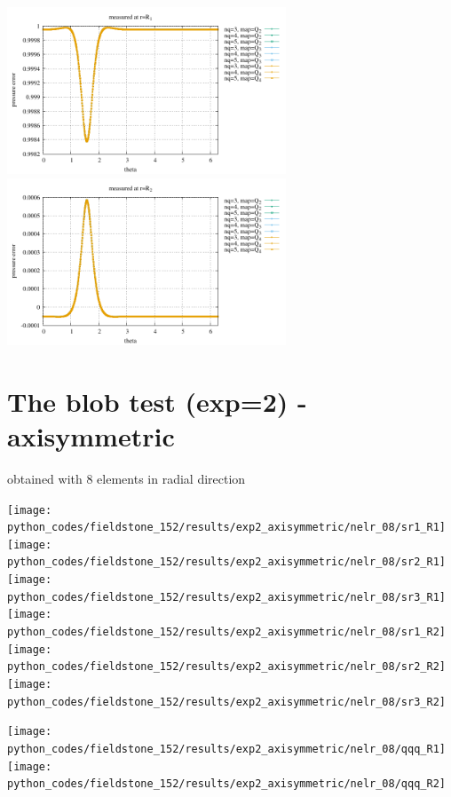 \begin{center}
\includegraphics[width=8.3cm]{python_codes/fieldstone_152/results/exp2/qqq_R1}
\includegraphics[width=8.3cm]{python_codes/fieldstone_152/results/exp2/qqq_R2}
\end{center}

\newpage
\section*{The blob test (exp=2) - axisymmetric}

obtained with 8 elements in radial direction

\begin{center}
\texttt{[image: python\_codes/fieldstone\_152/results/exp2\_axisymmetric/nelr\_08/sr1\_R1]}
\texttt{[image: python\_codes/fieldstone\_152/results/exp2\_axisymmetric/nelr\_08/sr2\_R1]}
\texttt{[image: python\_codes/fieldstone\_152/results/exp2\_axisymmetric/nelr\_08/sr3\_R1]}\\
\texttt{[image: python\_codes/fieldstone\_152/results/exp2\_axisymmetric/nelr\_08/sr1\_R2]}
\texttt{[image: python\_codes/fieldstone\_152/results/exp2\_axisymmetric/nelr\_08/sr2\_R2]}
\texttt{[image: python\_codes/fieldstone\_152/results/exp2\_axisymmetric/nelr\_08/sr3\_R2]}\\
\end{center}

\begin{center}
\texttt{[image: python\_codes/fieldstone\_152/results/exp2\_axisymmetric/nelr\_08/qqq\_R1]}
\texttt{[image: python\_codes/fieldstone\_152/results/exp2\_axisymmetric/nelr\_08/qqq\_R2]}
\end{center}

